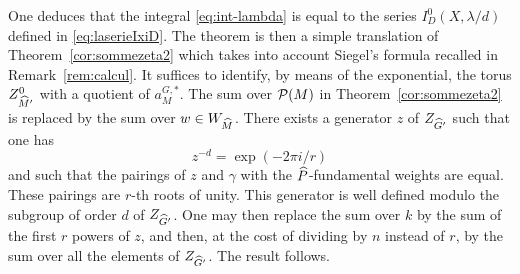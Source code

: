 \begin{paragr}
One deduces that the integral \eqref{eq:int-lambda} is equal to the series $I^0_D(X,\lambda/d)$ defined in \eqref{eq:laserieIxiD}. The theorem is then a simple translation of Theorem~\ref{cor:sommezeta2} which takes into account Siegel's formula recalled in Remark~\ref{rem:calcul}. It suffices to identify, by means of the exponential, the torus $Z^0_{\widehat{M}'}$ with a quotient of $a_M^{G,*}$. The sum over $\mathcal{P}(M)$ in Theorem~\ref{cor:sommezeta2} is replaced by the sum over $w\in W_{\widehat{M}}$. There exists a generator $z$ of $Z_{\widehat{G}'}$ such that one has
$$z^{-d}=\exp(-2\pi i/r)$$
and such that the pairings of $z$ and $\gamma$ with the $\widehat{P}$-fundamental weights are equal. These pairings are $r$-th roots of unity. This generator is well defined modulo the subgroup of order $d$ of $Z_{\widehat{G}'}$. One may then replace the sum over $k$ by the sum of the first $r$ powers of $z$, and then, at the cost of dividing by $n$ instead of $r$, by the sum over all the elements of $Z_{\widehat{G}'}$. The result follows.
\end{paragr}

